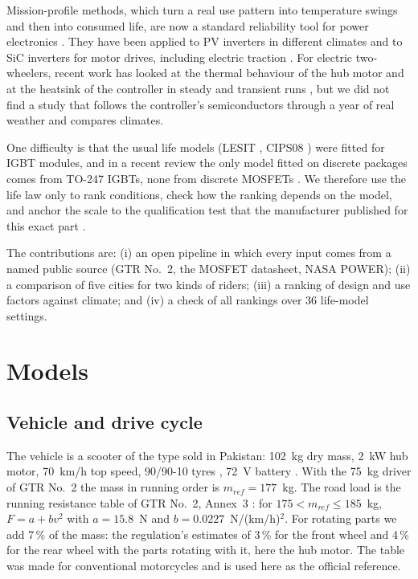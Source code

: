 \documentclass[conference]{IEEEtran}
\begin{document}
Mission-profile methods, which turn a real use pattern into temperature
swings and then into consumed life, are now a standard reliability tool for
power electronics \cite{wang2013}. They have been applied to PV inverters
in different climates \cite{brito2018} and to SiC inverters for motor
drives, including electric traction \cite{barbagallo2021}. For electric two-wheelers, recent work has looked
at the thermal behaviour of the hub motor \cite{deshmukh2026} and at the
heatsink of the controller in steady and transient runs \cite{tripathi2023},
but we did not find a study that follows the controller's semiconductors
through a year of real weather and compares climates.

One difficulty is that the usual life models (LESIT \cite{held1997}, CIPS08
\cite{bayerer2008}) were fitted for IGBT modules, and in a recent review the
only model fitted on discrete packages comes from TO-247 IGBTs, none from
discrete MOSFETs \cite{wang2025}.
We therefore use the life law only to rank conditions, check how the ranking
depends on the model, and anchor the scale to the qualification test that
the manufacturer published for this exact part \cite{infineonqual}.

The contributions are: (i) an open pipeline in which every input comes from
a named public source (GTR No.~2, the MOSFET datasheet, NASA POWER); (ii) a
comparison of five cities for two kinds of riders; (iii) a ranking of
design and use factors against climate; and (iv) a check of all rankings
over 36 life-model settings.

\section{Models}
\subsection{Vehicle and drive cycle}
The vehicle is a scooter of the type sold in Pakistan: 102~kg dry mass,
2~kW hub motor, 70~km/h top speed, 90/90-10 tyres \cite{garipk}, 72~V
battery \cite{pakwheels}. With the 75~kg driver of GTR No.~2 the mass in
running order is $m_{ref}=177$~kg. The road load is the running resistance
table of GTR No.~2, Annex~3 \cite{gtr2}: for $175<m_{ref}\le185$~kg,
$F=a+bv^2$ with $a=15.8$~N and $b=0.0227$~N/(km/h)$^2$. For rotating parts
we add 7\,\% of the mass: the regulation's estimates of 3\,\% for the front
wheel and 4\,\% for the rear wheel with the parts rotating with it, here the
hub motor. The table was made for
conventional motorcycles and is used here as the official reference.
\end{document}

